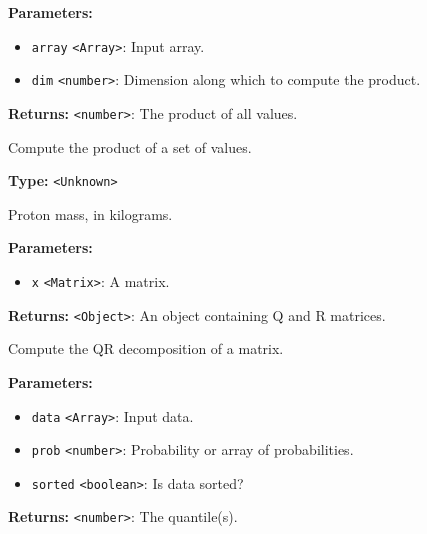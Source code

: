 \documentclass[12pt,a4paper]{article}
\begin{document}
\noindent \textbf{Parameters:}
\begin{itemize}
  \item \texttt{array} \texttt{<Array>}: Input array.
  \item \texttt{dim} \texttt{<number>}: Dimension along which to compute the product.
\end{itemize}

\noindent \textbf{Returns:} \texttt{<number>}: The product of all values.

\noindent Compute the product of a set of values.

\vspace{5mm}
\noindent {}\vspace{4mm}


\noindent \textbf{Type:} \texttt{<Unknown>}

\noindent Proton mass, in kilograms.

\vspace{5mm}
\noindent {}


\noindent \textbf{Parameters:}
\begin{itemize}
  \item \texttt{x} \texttt{<Matrix>}: A matrix.
\end{itemize}

\noindent \textbf{Returns:} \texttt{<Object>}: An object containing Q and R matrices.

\noindent Compute the QR decomposition of a matrix.

\vspace{5mm}
\noindent {}


\noindent \textbf{Parameters:}
\begin{itemize}
  \item \texttt{data} \texttt{<Array>}: Input data.
  \item \texttt{prob} \texttt{<number>}: Probability or array of probabilities.
  \item \texttt{sorted} \texttt{<boolean>}: Is data sorted?
\end{itemize}

\noindent \textbf{Returns:} \texttt{<number>}: The quantile(s).
\end{document}
